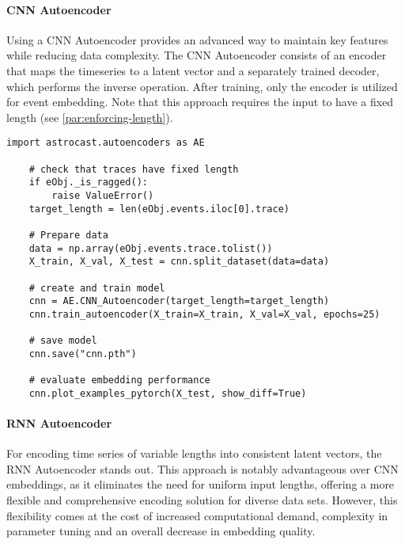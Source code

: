 \paragraph{\ac{CNN} Autoencoder}

Using a \ac{CNN} Autoencoder provides an advanced way to maintain key features while reducing data complexity. The CNN Autoencoder consists of an encoder that maps the timeseries to a latent vector and a separately trained decoder, which performs the inverse operation. After training, only the encoder is utilized for event embedding. Note that this approach requires the input to have a fixed length (see \ref{par:enforcing-length}).

\begin{lstlisting}[style=pyStyle]
    import astrocast.autoencoders as AE

    # check that traces have fixed length
    if eObj._is_ragged():
        raise ValueError()
    target_length = len(eObj.events.iloc[0].trace)

    # Prepare data
    data = np.array(eObj.events.trace.tolist())
    X_train, X_val, X_test = cnn.split_dataset(data=data)

    # create and train model
    cnn = AE.CNN_Autoencoder(target_length=target_length)
    cnn.train_autoencoder(X_train=X_train, X_val=X_val, epochs=25)

    # save model
    cnn.save("cnn.pth")

    # evaluate embedding performance
    cnn.plot_examples_pytorch(X_test, show_diff=True)
\end{lstlisting}

\paragraph{\ac{RNN} Autoencoder}

For encoding time series of variable lengths into consistent latent vectors, the \ac{RNN} Autoencoder stands out. This approach is notably advantageous over CNN embeddings, as it eliminates the need for uniform input lengths, offering a more flexible and comprehensive encoding solution for diverse data sets. However, this flexibility comes at the cost of increased computational demand, complexity in parameter tuning and an overall decrease in embedding quality.

